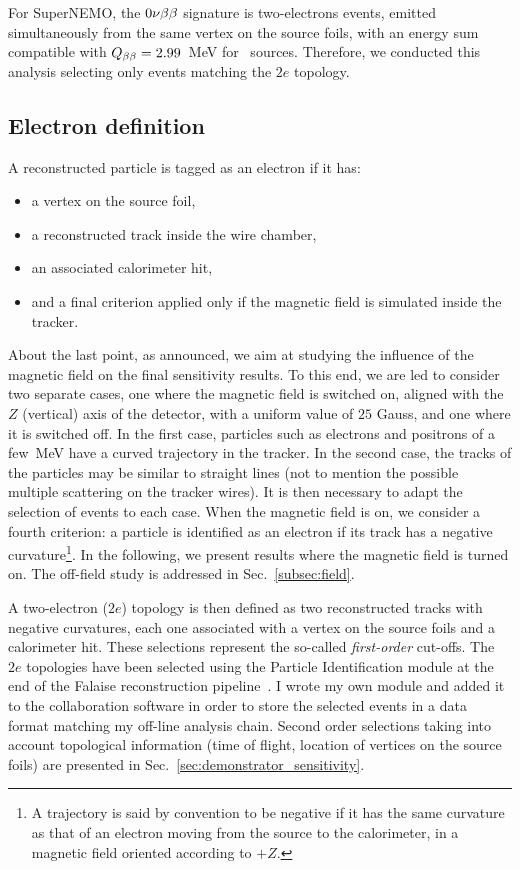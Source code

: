 For SuperNEMO, the $0\nu\beta\beta$ signature is two-electrons events, emitted simultaneously from the same vertex on the source foils, with an energy sum compatible with $Q_{\beta\beta} = 2.99$~MeV for \Se\ sources.
Therefore, we conducted this analysis selecting only events matching the $2e$ topology.

\subsection{Electron definition}

A reconstructed particle is tagged as an electron if it has:
\begin{itemize}
\item a vertex on the source foil,
\item a reconstructed track inside the wire chamber,
\item an associated calorimeter hit,
\item and a final criterion applied only if the magnetic field is simulated inside the tracker.
\end{itemize}
About the last point, as announced, we aim at studying the influence of the magnetic field on the final sensitivity results.
To this end, we are led to consider two separate cases, one where the magnetic field is switched on, aligned with the $Z$ (vertical) axis of the detector, with a uniform value of $25$ Gauss, and one where it is switched off.
In the first case, particles such as electrons and positrons of a few~MeV have a curved trajectory in the tracker.
In the second case, the tracks of the particles may be similar to straight lines (not to mention the possible multiple scattering on the tracker wires).
It is then necessary to adapt the selection of events to each case.
When the magnetic field is on, we consider a fourth criterion: a particle is identified as an electron if its track has a negative curvature\footnote{A trajectory is said by convention to be negative if it has the same curvature as that of an electron moving from the source to the calorimeter, in a magnetic field oriented according to $+Z$.}.
In the following, we present results where the magnetic field is turned on.
The off-field study is addressed in Sec.~\ref{subsec:field}.

A two-electron ($2e$) topology is then defined as two reconstructed tracks with negative curvatures, each one associated with a vertex on the source foils and a calorimeter hit.
These selections represent the so-called \emph{first-order} cut-offs.
The $2e$ topologies have been selected using the Particle Identification module at the end of the Falaise reconstruction pipeline~\cite{CalvezThesis}.
I wrote my own module and added it to the collaboration software in order to store the selected events in a data format matching my off-line analysis chain.
Second order selections taking into account topological information (time of flight, location of vertices on the source foils) are presented in Sec.~\ref{sec:demonstrator_sensitivity}.

